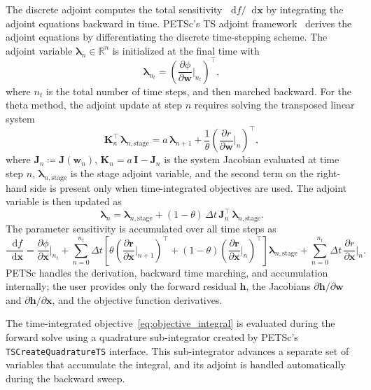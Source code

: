 \documentclass[journal]{new-aiaa}
\newcommand{\f}[2]{\frac{#1}{#2}}
\newcommand{\mb}[1]{\mathbf{#1}}
\newcommand{\mbg}[1]{\bm{#1}}
\renewcommand{\d}{\mathop{}\!\mathrm{d}} %
\newcommand{\p}{\partial}
\begin{document}
The discrete adjoint computes the total sensitivity $\d f / \d \mb{x}$ by integrating the adjoint equations backward in time.
PETSc's TS adjoint framework~\cite{Zhang2022} derives the adjoint equations by differentiating the discrete time-stepping scheme.
The adjoint variable $\mbg{\lambda}_n \in \mathbb{R}^n$ is initialized at the final time with
\begin{equation}\label{eq:adjoint_terminal}
\mbg{\lambda}_{n_t} = \left(\f{\p \phi}{\p \mb{w}}\bigg|_{n_t}\right)^\intercal,
\end{equation}
where $n_t$ is the total number of time steps, and then marched backward.
For the theta method, the adjoint update at step $n$ requires solving the transposed linear system
\begin{equation}\label{eq:adjoint_system}
\mb{K}_n^\intercal \, \mbg{\lambda}_{n,\text{stage}} = a \, \mbg{\lambda}_{n+1} + \frac{1}{\theta} \left(\f{\p r}{\p \mb{w}}\bigg|_n\right)^\intercal,
\end{equation}
where $\mb{J}_n \coloneqq \mb{J}(\mb{w}_n)$, $\mb{K}_n = a \, \mb{I} - \mb{J}_n$ is the system Jacobian evaluated at time step $n$, $\mbg{\lambda}_{n,\text{stage}}$ is the stage adjoint variable, and the second term on the right-hand side is present only when time-integrated objectives are used.
The adjoint variable is then updated as
\begin{equation}\label{eq:adjoint_update}
\mbg{\lambda}_{n} = \mbg{\lambda}_{n,\text{stage}} + (1-\theta) \, \Delta t \, \mb{J}_n^\intercal \, \mbg{\lambda}_{n,\text{stage}}.
\end{equation}
The parameter sensitivity is accumulated over all time steps as
\begin{equation}\label{eq:param_sens}
\f{\d f}{\d \mb{x}} = \f{\p \phi}{\p \mb{x}}\bigg|_{n_t} + \sum_{n=0}^{n_t} \Delta t \left[\theta \left(\f{\p \mb{r}}{\p \mb{x}}\bigg|_{n+1}\right)^\intercal + (1-\theta) \left(\f{\p \mb{r}}{\p \mb{x}}\bigg|_{n}\right)^\intercal\right] \mbg{\lambda}_{n,\text{stage}} + \sum_{n=0}^{n_t} \Delta t \, \f{\p r}{\p \mb{x}}\bigg|_{n}.
\end{equation}
PETSc handles the derivation, backward time marching, and accumulation internally; the user provides only the forward residual $\mb{h}$, the Jacobians $\p \mb{h}/\p \mb{w}$ and $\p \mb{h}/\p \mb{x}$, and the objective function derivatives.

The time-integrated objective~\eqref{eq:objective_integral} is evaluated during the forward solve using a quadrature sub-integrator created by PETSc's \texttt{TSCreateQuadratureTS} interface.
This sub-integrator advances a separate set of variables that accumulate the integral, and its adjoint is handled automatically during the backward sweep.
\end{document}
